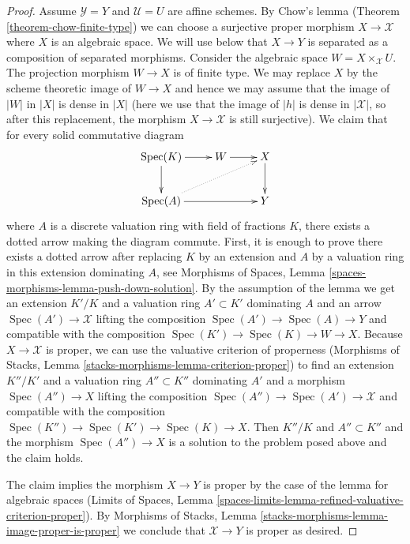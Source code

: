 \documentclass{stacks-project}
\theoremstyle{plain}
\theoremstyle{definition}
\theoremstyle{remark}
\numberwithin{equation}{subsection}
\def\Spec{\mathop{\mathrm{Spec}}}
\begin{document}
\begin{proof}
\medskip\noindent
Assume $\mathcal{Y} = Y$ and $\mathcal{U} = U$ are affine schemes.
By Chow's lemma (Theorem \ref{theorem-chow-finite-type})
we can choose a surjective proper morphism $X \to \mathcal{X}$
where $X$ is an algebraic space. We will use below that $X \to Y$ is separated
as a composition of separated morphisms. Consider the
algebraic space $W = X \times_\mathcal{X} U$. The projection morphism
$W \to X$ is of finite type.
We may replace $X$ by the scheme theoretic image of
$W \to X$ and hence we may assume that the image of $|W|$ in $|X|$
is dense in $|X|$ (here we use that the image of $|h|$
is dense in $|\mathcal{X}|$, so after this replacement, the
morphism $X \to \mathcal{X}$ is still surjective).
We claim that for every solid commutative diagram
$$
\xymatrix{
\Spec(K) \ar[r] \ar[d] & W \ar[r] & X \ar[d] \\
\Spec(A) \ar[rr] \ar@{..>}[rru] & & Y
}
$$
where $A$ is a discrete valuation ring with field of fractions $K$, there
exists a dotted arrow making the diagram commute. First, it is enough to
prove there exists a dotted arrow after replacing $K$ by an extension
and $A$ by a valuation ring in this extension dominating $A$, see
Morphisms of Spaces, Lemma \ref{spaces-morphisms-lemma-push-down-solution}.
By the assumption of the lemma we get an extension $K'/K$ and a valuation
ring $A' \subset K'$ dominating $A$ and
an arrow $\Spec(A') \to \mathcal{X}$ lifting the composition
$\Spec(A') \to \Spec(A) \to Y$ and compatible with the composition
$\Spec(K') \to \Spec(K) \to W \to X$. Because $X \to \mathcal{X}$
is proper, we can use the valuative criterion of properness
(Morphisms of Stacks, Lemma \ref{stacks-morphisms-lemma-criterion-proper})
to find an extension $K''/K'$ and a valuation ring $A'' \subset K''$
dominating $A'$ and a morphism $\Spec(A'') \to X$ lifting the composition
$\Spec(A'') \to \Spec(A') \to \mathcal{X}$ and compatible with the composition
$\Spec(K'') \to \Spec(K') \to \Spec(K) \to X$.
Then $K''/K$ and $A'' \subset K''$ and the morphism $\Spec(A'') \to X$
is a solution to the problem posed above and the claim holds.

\medskip\noindent
The claim implies the morphism $X \to Y$ is proper by the
case of the lemma for algebraic spaces
(Limits of Spaces, Lemma
\ref{spaces-limits-lemma-refined-valuative-criterion-proper}).
By Morphisms of Stacks, Lemma
\ref{stacks-morphisms-lemma-image-proper-is-proper}
we conclude that $\mathcal{X} \to Y$ is proper as desired.
\end{proof}
\end{document}

